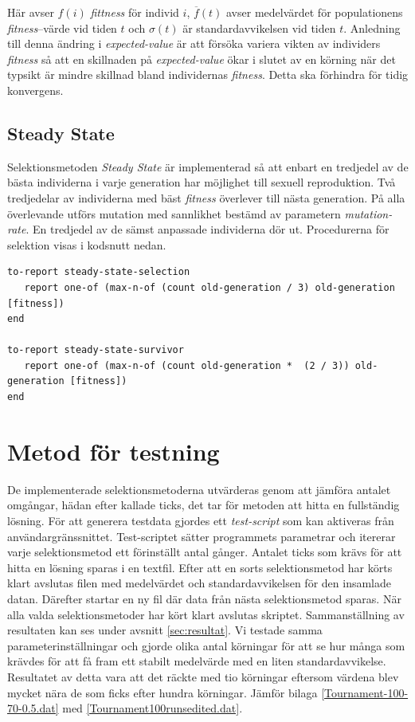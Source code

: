 \documentclass[titlepage, a4paper, 12pt]{article}
\begin{document}
Här avser $f(i)$ \textit{fittness} för individ $i$, $\overline{f}(t)$
avser medelvärdet för populationens \textit{fitness}–värde vid tiden
$t$ och $\sigma(t)$ är standardavvikelsen vid tiden $t$. Anledning
till denna ändring i \textit{expected-value} är att försöka variera
vikten av individers \textit{fitness} så att en skillnaden på
\textit{expected-value} ökar i slutet av en körning när det typsikt är
mindre skillnad bland individernas \textit{fitness}. Detta ska
förhindra för tidig konvergens.

\subsection{Steady State}
Selektionsmetoden \textit{Steady State} är implementerad så att enbart
en tredjedel av de bästa individerna i varje generation har möjlighet
till sexuell reproduktion. Två tredjedelar av individerna med bäst
\textit{fitness} överlever till nästa generation. På alla överlevande
utförs mutation med sannlikhet bestämd av parametern
\textit{mutation-rate}. En tredjedel av de sämst anpassade individerna
dör ut. Procedurerna för selektion visas i kodsnutt nedan.

\begin{kod}[H]
  \begin{scriptsize}
\begin{verbatim}
to-report steady-state-selection
   report one-of (max-n-of (count old-generation / 3) old-generation [fitness])
end

to-report steady-state-survivor
   report one-of (max-n-of (count old-generation *  (2 / 3)) old-generation [fitness])
end
\end{verbatim}
  \end{scriptsize}
\end{kod}

\section{Metod för testning}
De implementerade selektionsmetoderna utvärderas genom att jämföra
antalet omgångar, hädan efter kallade ticks, det tar för metoden att
hitta en fullständig lösning. För att generera testdata gjordes ett
\textit{test-script} som kan aktiveras från
användargränssnittet. Test-scriptet sätter programmets parametrar och
itererar varje selektionsmetod ett förinställt antal gånger. Antalet
ticks som krävs för att hitta en lösning sparas i en textfil. Efter
att en sorts selektionsmetod har körts klart avslutas filen med
medelvärdet och standardavvikelsen för den insamlade datan. Därefter
startar en ny fil där data från nästa selektionsmetod sparas. När alla
valda selektionsmetoder har kört klart avslutas
skriptet. Sammanställning av resultaten kan ses under avsnitt
\ref{sec:resultat}. Vi testade samma parameterinställningar och gjorde
olika antal körningar för att se hur många som krävdes för att få fram
ett stabilt medelvärde med en liten standardavvikelse. Resultatet av
detta vara att det räckte med tio körningar eftersom värdena blev
mycket nära de som ficks efter hundra körningar. Jämför bilaga
\ref{Tournament-100-70-0.5.dat} med
\ref{Tournament100runsedited.dat}.
\end{document}
